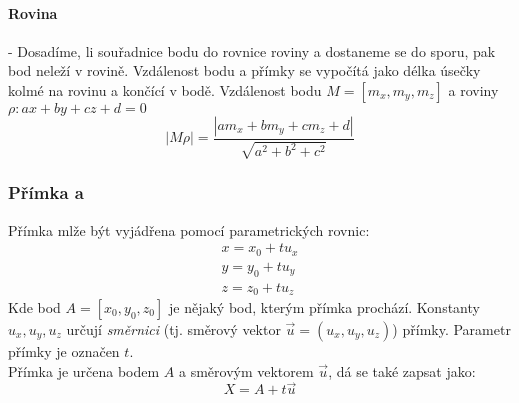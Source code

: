 \documentclass[12pt]{article}
\begin{document}
\paragraph{Rovina} - Dosadíme, li souřadnice bodu do rovnice roviny a dostaneme se do sporu, pak bod neleží v rovině. Vzdálenost bodu a přímky se vypočítá jako délka úsečky kolmé na rovinu a končící v bodě. Vzdálenost bodu $M = [m_x, m_y, m_z]$ a roviny $\rho: ax +by +cz +d =0$
\begin{equation}
|M\rho| = \frac{|am_x + bm_y + cm_z + d|}{\sqrt{a^2 + b^2 + c^2}}
\end{equation}
\subsubsection{Přímka a}
\label{sec:stereo_polohy-primka}
Přímka mlže být vyjádřena pomocí parametrických rovnic:
\begin{align}
x = x_0 + tu_x\\
y = y_0 + tu_y\\
z = z_0 +tu_z
\end{align}
Kde bod $A = [x_0,y_0,z_0]$ je nějaký bod, kterým přímka prochází. Konstanty $u_x, u_y, u_z$ určují \emph{směrnici} (tj. směrový vektor $\vec{u} = (u_x, u_y, u_z)$) přímky. Parametr přímky je označen $t$.\\
Přímka je určena bodem $A$ a směrovým vektorem $\vec{u}$, dá se také zapsat jako:
\begin{equation}
X = A +t \vec{u}
\end{equation}
\end{document}
